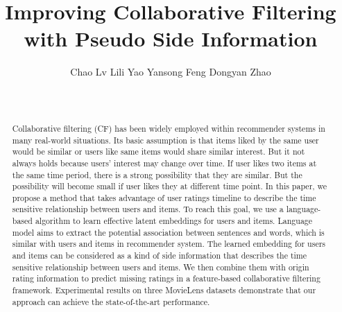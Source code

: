 \documentclass{sig-alternate-05-2015}
\begin{document}

\title{Improving Collaborative Filtering with Pseudo Side Information}

\author{
\alignauthor
Chao Lv \quad
Lili Yao \quad
Yansong Feng \quad
Dongyan Zhao\\
\\
\\
}

\maketitle

\begin{abstract}
Collaborative filtering (CF) has been widely employed within recommender systems in many real-world situations.
Its basic assumption is that items liked by the same user would be similar or users like same items would share similar interest.
But it not always holds because users' interest may change over time.
If user likes two items at the same time period, there is a strong possibility that they are similar.
But the possibility will become small if user likes they at different time point.
In this paper, we propose a method that takes advantage of user ratings timeline to describe the time sensitive relationship between users and items.
To reach this goal, we use a language-based algorithm to learn effective latent embeddings for users and items.
Language model aims to extract the potential association between sentences and words, which is similar with users and items in recommender system.
The learned embedding for users and items can be considered as a kind of side information that describes the time sensitive relationship between users and items.
We then combine them with origin rating information to predict missing ratings in a feature-based collaborative filtering framework.
Experimental results on three MovieLens datasets demonstrate that our approach can achieve the state-of-the-art performance.
\end{abstract}

\end{document}
